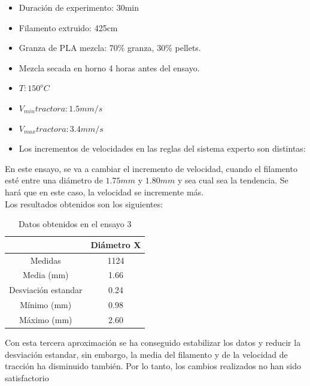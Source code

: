 \begin{itemize}
	\item{Duración de experimento: 30min}
	\item{Filamento extruido: 425cm}
	\item{Granza de PLA mezcla: 70\% granza, 30\% pellets.}
	\item{Mezcla secada en horno 4 horas antes del ensayo.}
	\item{$T: 150^oC$}
	\item{$V_{min} tractora: 1.5 mm/s$}
	\item{$V_{max} tractora: 3.4 mm/s$}
	\item{Los incrementos de velocidades en las reglas del sistema experto son distintas:}
\end{itemize}

En este ensayo, se va a cambiar el incremento de velocidad, cuando el filamento esté entre una diámetro de $1.75 mm$ y $1.80 mm$ y sea cual sea la tendencia. Se hará que en este caso, la velocidad se incremente más.\\

Los resultados obtenidos son los siguientes:

\begin{table}[H]
	\centering
	\begin{tabular}{cc}
		                    & Diámetro X \\ \hline
		Medidas             & 1124      \\
		Media (mm)          & 1.66       \\
		Desviación estandar & 0.24       \\
		Mínimo (mm)         & 0.98       \\
		Máximo (mm)         & 2.60      
	\end{tabular}
	\caption{Datos obtenidos en el ensayo 3}
	\label{tab:resl_ens3}
\end{table}

Con esta tercera aproximación se ha conseguido estabilizar los datos y reducir la desviación estandar, sin embargo, la media del filamento y de la velocidad de tracción ha disminuido también. Por lo tanto, los cambios realizados no han sido satisfactorio

